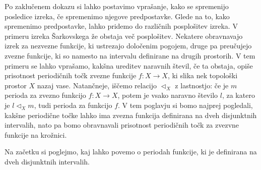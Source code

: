\documentclass[../TG_magistrsko_delo_sections.tex]{subfiles}
\begin{document}
Po zaklučenem dokazu si lahko postavimo vprašanje, kako se spremenijo posledice izreka, če spremenimo njegove predpostavke. Glede na to, kako spremenimo predpostavke, lahko pridemo do različnih posplošitev izreka. V primeru izreka Šarkovskega že obstaja več posplošitev. Nekatere obravnavajo izrek za nezvezne funkcije, ki ustrezajo določenim pogojem, druge pa preučujejo zvezne funkcije, ki so namesto na intervalu definirane na drugih prostorih. V tem primeru se lahko vprašamo, kakšna ureditev naravnih števil, če ta obstaja, opiše prisotnost periodičnih točk zvezne funkcije $f:X \to X$, ki slika nek topološki prostor $X$ nazaj vase.  Natančneje, iščemo relacijo $\triangleleft_X$ z lastnostjo: če je $m$ perioda za zvezno funkcijo $f:X \to X$, potem je vsako naravno število $l$, za katero je $l \triangleleft_X m$, tudi perioda za funkcijo $f$.
V tem poglavju si bomo najprej pogledali, kakšne periodične točke lahko ima zvezna funkcija definirana na dveh disjunktnih intervalih, nato pa bomo obravnavali prisotnost periodičnih točk za zvezvne funkcije na krožnici.

Na začetku si poglejmo, kaj lahko povemo o periodah funkcije, ki je definirana na dveh disjunktnih intervalih.
\end{document}
